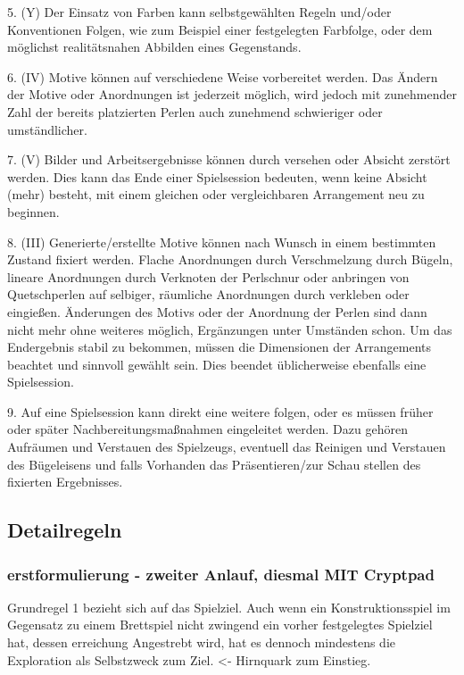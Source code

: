 \documentclass[11pt,a4paper,twoside]{scrreprt}
\begin{document}
5. (Y) Der Einsatz von Farben kann selbstgewählten Regeln und/oder Konventionen Folgen, wie zum Beispiel einer festgelegten Farbfolge, oder dem möglichst realitätsnahen Abbilden eines Gegenstands.

6. (IV) Motive können auf verschiedene Weise vorbereitet werden. Das Ändern der Motive oder Anordnungen ist jederzeit möglich, wird jedoch mit zunehmender Zahl der bereits platzierten Perlen auch zunehmend schwieriger oder umständlicher. 

7. (V) Bilder und Arbeitsergebnisse können durch versehen oder Absicht zerstört werden. Dies kann das Ende einer Spielsession bedeuten, wenn keine Absicht (mehr) besteht, mit einem gleichen oder vergleichbaren Arrangement neu zu beginnen. 

8. (III) Generierte/erstellte Motive können nach Wunsch in einem bestimmten Zustand fixiert werden. Flache Anordnungen durch Verschmelzung durch Bügeln, lineare Anordnungen durch Verknoten der Perlschnur oder anbringen von Quetschperlen auf selbiger, räumliche Anordnungen durch verkleben oder eingießen. Änderungen des Motivs oder der Anordnung der Perlen sind dann nicht mehr ohne weiteres möglich, Ergänzungen unter Umständen schon. Um das Endergebnis stabil zu bekommen, müssen die Dimensionen der Arrangements beachtet und sinnvoll gewählt sein. Dies beendet üblicherweise ebenfalls eine Spielsession. 

9. Auf eine Spielsession kann direkt eine weitere folgen, oder es müssen früher oder später Nachbereitungsmaßnahmen eingeleitet werden. Dazu gehören Aufräumen und Verstauen des Spielzeugs, eventuell das Reinigen und Verstauen des Bügeleisens und falls Vorhanden das Präsentieren/zur Schau stellen des fixierten Ergebnisses. 

		\subsection{Detailregeln}
			\subsubsection{erstformulierung - zweiter Anlauf, diesmal MIT Cryptpad}

Grundregel 1 bezieht sich auf das Spielziel. Auch wenn ein Konstruktionsspiel im Gegensatz zu einem Brettspiel nicht zwingend ein vorher festgelegtes Spielziel hat, dessen erreichung Angestrebt wird, hat es dennoch mindestens die Exploration als Selbstzweck zum Ziel. <- Hirnquark zum Einstieg.
\end{document}
